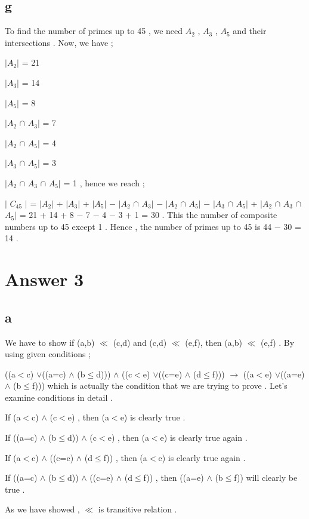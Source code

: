 \documentclass[12pt]{article}
\begin{document}
\subsection*{g}
\hspace{15px} To find the number of primes up to 45 , we need \textit{$A_2$} , \textit{$A_3$} , \textit{$A_5$} and their intersections .  Now, we have ; \par 
$|$\textit{$A_2$}$|$ = 21 \par 
$|$\textit{$A_3$}$|$ = 14 \par 
$|$\textit{$A_5$}$|$ = 8 \par 
$|$\textit{$A_2$} $\cap$ \textit{$A_3$}$|$ = 7 \par 
$|$\textit{$A_2$} $\cap$ \textit{$A_5$}$|$ = 4 \par 
$|$\textit{$A_3$} $\cap$ \textit{$A_5$}$|$ = 3 \par 
$|$\textit{$A_2$} $\cap$ \textit{$A_3$} $\cap$ \textit{$A_5$}$|$ = 1  , hence we reach ;\par 
$|$ \textit{$C_{45}$} $|$ = $|$\textit{$A_2$}$|$ + $|$\textit{$A_3$}$|$ + $|$\textit{$A_5$}$|$ \textit{$-$} $|$\textit{$A_2$} $\cap$ \textit{$A_3$}$|$ \textit{$-$} $|$\textit{$A_2$} $\cap$ \textit{$A_5$}$|$ \textit{$-$} $|$\textit{$A_3$} $\cap$ \textit{$A_5$}$|$ + $|$\textit{$A_2$} $\cap$ \textit{$A_3$} $\cap$ \textit{$A_5$}$|$  = 21 + 14 + 8 \textit{$-$} 7 \textit{$-$} 4 \textit{$-$} 3 + 1 = 30 . This the number of composite numbers up to 45 except 1 . Hence , the number of primes up to 45 is 44 \textit{$-$} 30 = 14 .
\section*{Answer 3}
\subsection*{a}
\hspace{15px} We have to show if (a,b) $\ll$ (c,d) and (c,d) $\ll$ (e,f), then (a,b) $\ll$ (e,f) . By using given conditions ; \par 
((a$<$c) $\vee$((a=c) $\wedge$ (b$\leq$d))) $\wedge$ ((c$<$e) $\vee$((c=e) $\wedge$ (d$\leq$f))) $\rightarrow$ ((a$<$e) $\vee$((a=e) $\wedge$ (b$\leq$f))) which is actually the condition that we are trying to prove . Let's examine conditions in detail . \par 
If (a$<$c) $\wedge$ (c$<$e) , then (a$<$e) is clearly true . \par 
If ((a=c) $\wedge$ (b$\leq$d)) $\wedge$ (c$<$e) , then (a$<$e) is clearly true again . \par 
If (a$<$c) $\wedge$ ((c=e) $\wedge$ (d$\leq$f)) , then (a$<$e) is clearly true again . \par 
If ((a=c) $\wedge$ (b$\leq$d)) $\wedge$ ((c=e) $\wedge$ (d$\leq$f)) , then ((a=e) $\wedge$ (b$\leq$f)) will clearly be true . \par 
As we have showed , $\ll$ is transitive relation .
\end{document}
